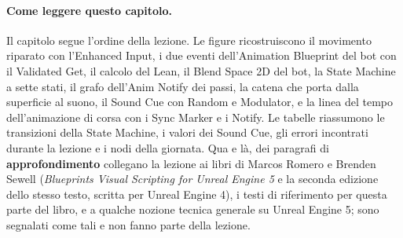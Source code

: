 \paragraph{Come leggere questo capitolo.} Il capitolo segue l'ordine della lezione. Le
figure ricostruiscono il movimento riparato con l'Enhanced Input, i due eventi
dell'Animation Blueprint del bot con il Validated Get, il calcolo del Lean, il Blend
Space 2D del bot, la State Machine a sette stati, il grafo dell'Anim Notify dei passi, la
catena che porta dalla superficie al suono, il Sound Cue con Random e Modulator, e la
linea del tempo dell'animazione di corsa con i Sync Marker e i Notify. Le tabelle
riassumono le transizioni della State Machine, i valori dei Sound Cue, gli errori
incontrati durante la lezione e i nodi della giornata. Qua e là, dei paragrafi di
\textbf{approfondimento} collegano la lezione ai libri di Marcos Romero e Brenden Sewell
(\emph{Blueprints Visual Scripting for Unreal Engine 5} e la seconda edizione dello
stesso testo, scritta per Unreal Engine 4), i testi di riferimento per questa parte del
libro, e a qualche nozione tecnica generale su Unreal Engine 5; sono segnalati come tali
e non fanno parte della lezione.

